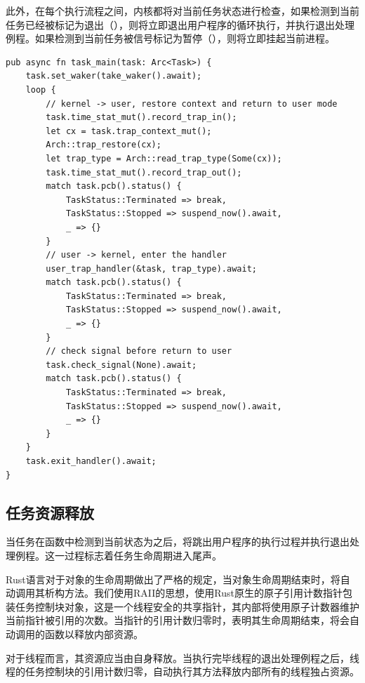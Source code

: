 \documentclass{article}
\begin{document}
此外，在每个执行流程之间，内核都将对当前任务状态进行检查，如果检测到当前任务已经被标记为退出（），则将立即退出用户程序的循环执行，并执行退出处理例程。如果检测到当前任务被信号标记为暂停（），则将立即挂起当前进程。

\begin{lstlisting}
pub async fn task_main(task: Arc<Task>) {
    task.set_waker(take_waker().await);
    loop {
        // kernel -> user, restore context and return to user mode
        task.time_stat_mut().record_trap_in();
        let cx = task.trap_context_mut();
        Arch::trap_restore(cx);
        let trap_type = Arch::read_trap_type(Some(cx));
        task.time_stat_mut().record_trap_out();
        match task.pcb().status() {
            TaskStatus::Terminated => break,
            TaskStatus::Stopped => suspend_now().await,
            _ => {}
        }
        // user -> kernel, enter the handler
        user_trap_handler(&task, trap_type).await;
        match task.pcb().status() {
            TaskStatus::Terminated => break,
            TaskStatus::Stopped => suspend_now().await,
            _ => {}
        }
        // check signal before return to user
        task.check_signal(None).await;
        match task.pcb().status() {
            TaskStatus::Terminated => break,
            TaskStatus::Stopped => suspend_now().await,
            _ => {}
        }
    }
    task.exit_handler().await;
}
\end{lstlisting}

\subsection{任务资源释放}

当任务在函数中检测到当前状态为之后，将跳出用户程序的执行过程并执行退出处理例程。这一过程标志着任务生命周期进入尾声。

Rust语言对于对象的生命周期做出了严格的规定，当对象生命周期结束时，将自动调用其析构方法。我们使用RAII的思想，使用Rust原生的原子引用计数指针包装任务控制块对象，这是一个线程安全的共享指针，其内部将使用原子计数器维护当前指针被引用的次数。当指针的引用计数归零时，表明其生命周期结束，将会自动调用的函数以释放内部资源。

对于线程而言，其资源应当由自身释放。当执行完毕线程的退出处理例程之后，线程的任务控制块的引用计数归零，自动执行其方法释放内部所有的线程独占资源。
\end{document}
